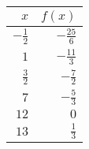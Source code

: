 \begin{tabular}{rr} \toprule
$x$            & $f(x)$          \\\midrule
$-\frac{1}{2}$ & $-\frac{25}{6}$ \\[6pt]
$1$            & $-\frac{11}{3}$ \\[6pt]
$\frac{3}{2}$  & $-\frac{7}{2}$  \\[6pt]
$7$            & $-\frac{5}{3}$  \\[6pt]
$12$           & $0$             \\[6pt]
$13$           & $\frac{1}{3}$   \\\bottomrule
\end{tabular}
